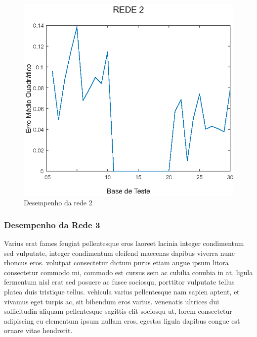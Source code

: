 \begin{figure}[h!]

\centering %
\includegraphics{04-Figuras/MSE_DesempenhoNet2}

\caption{Desempenho da rede 2}

\label{figura:rede2}

\end{figure}

\subsubsection{Desempenho da Rede 3}

Varius erat fames feugiat pellentesque eros laoreet lacinia integer condimentum sed vulputate, integer condimentum eleifend maecenas dapibus viverra nunc rhoncus eros. volutpat consectetur dictum purus etiam augue ipsum litora consectetur commodo mi, commodo est cursus sem ac cubilia conubia in at. ligula fermentum nisl erat sed posuere ac fusce sociosqu, porttitor vulputate tellus platea duis tristique tellus. vehicula varius pellentesque nam sapien aptent, et vivamus eget turpis ac, sit bibendum eros varius. venenatis ultrices dui sollicitudin aliquam pellentesque sagittis elit sociosqu ut, lorem consectetur adipiscing eu elementum ipsum nullam eros, egestas ligula dapibus congue est ornare vitae hendrerit.

